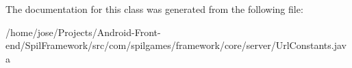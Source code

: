 The documentation for this class was generated from the following file\-:\begin{DoxyCompactItemize}
\item 
/home/jose/\-Projects/\-Android-\/\-Front-\/end/\-Spil\-Framework/src/com/spilgames/framework/core/server/Url\-Constants.\-java\end{DoxyCompactItemize}
